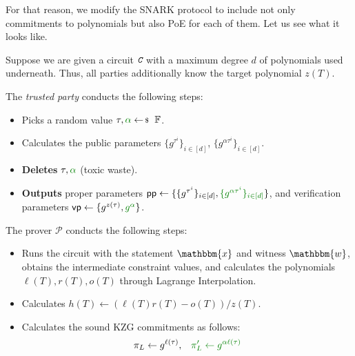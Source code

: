 \documentclass[../../book.tex]{subfiles}
\begin{document}
For that reason, we modify the SNARK protocol to include not only commitments to polynomials but also PoE for each of them. Let us see what it looks like.

\begin{tcolorbox}[title=Attempt \#2: SNARK with PoE included,
    breakable,
    colback=blue!5!white,
    colframe=blue!75!black,
    colbacktitle=blue!25!white,
    coltitle=blue!20!black,
    fonttitle=\bfseries,
    boxrule=1.25pt,
    subtitle style={boxrule=0pt,
    colback=blue!20!white,
    colupper=blue!75!gray} ]

    Suppose we are given a circuit $\textit{\texttt{C}}$ with a maximum degree $d$ of polynomials used underneath. Thus, all parties additionally know the target polynomial $z(T)$.

    The \emph{trusted party} conducts the following steps:
    \begin{itemize}[label=]
        \item Picks a random value $\tau, \textcolor{green!50!black}{\alpha} \leftarrowS \mathbb{F}$.
        \item Calculates the public parameters $\{g^{\tau^i}\}_{i \in [d]}$, \textcolor{green!50!black}{$\{g^{\alpha\tau^i}\}_{i \in [d]}$}.
        \item \textbf{Deletes} $\tau, \textcolor{green!50!black}{\alpha}$ (toxic waste).
        \item \textbf{Outputs} proper parameters $\mathsf{pp}\gets\{\{g^{\tau^i}\}_{i \in [d]}, \textcolor{green!50!black}{\{g^{\alpha\tau^i}\}_{i \in [d]}}\}$, and verification parameters $\mathsf{vp} \gets \{g^{z(\tau)}, \textcolor{green!50!black}{g^{\alpha}}\}$.
    \end{itemize}
    The prover $\mathcal{P}$ conducts the following steps:
    \begin{itemize}[label=]
        \item Runs the circuit with the statement $\mathbbm{x}$ and witness $\mathbbm{w}$, obtains the intermediate constraint values, and calculates the polynomials $\ell(T), r(T), o(T)$ through Lagrange Interpolation.
        \item Calculates $h(T) \gets (\ell(T)r(T) - o(T))\big/ z(T)$.
        \item Calculates the sound KZG commitments as follows: 
        \begin{align*}
            \pi_L \gets g^{\ell(\tau)}, & \quad\textcolor{green!50!black}{\pi_L' \gets g^{\alpha \ell(\tau)}} \\

\end{align*}
\end{itemize}
\end{tcolorbox}
\end{document}
